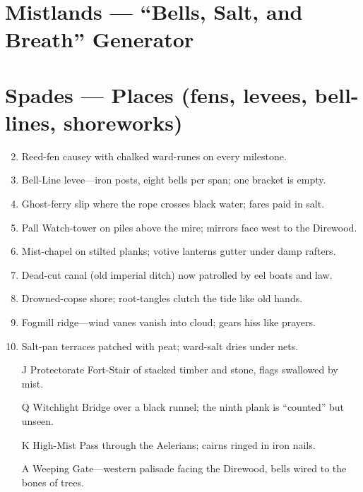 \section{Mistlands --- ``Bells, Salt, and Breath'' Generator}
\label{chap:mistlands}

\section*{Spades --- Places (fens, levees, bell-lines, shoreworks)}
\label{sec:mistlands-places}
\begin{enumerate}
\setcounter{enumi}{1}
\item Reed-fen causey with chalked ward-runes on every milestone.
\item Bell-Line levee---iron posts, eight bells per span; one bracket is empty.
\item Ghost-ferry slip where the rope crosses black water; fares paid in salt.
\item Pall Watch-tower on piles above the mire; mirrors face west to the Direwood.
\item Mist-chapel on stilted planks; votive lanterns gutter under damp rafters.
\item Dead-cut canal (old imperial ditch) now patrolled by eel boats and law.
\item Drowned-copse shore; root-tangles clutch the tide like old hands.
\item Fogmill ridge---wind vanes vanish into cloud; gears hiss like prayers.
\item Salt-pan terraces patched with peat; ward-salt dries under nets.
\item[J] Protectorate Fort-Stair of stacked timber and stone, flags swallowed by mist.
\item[Q] Witchlight Bridge over a black runnel; the ninth plank is ``counted'' but unseen.
\item[K] High-Mist Pass through the Aelerians; cairns ringed in iron nails.
\item[A] Weeping Gate---western palisade facing the Direwood, bells wired to the bones of trees.
\end{enumerate}

